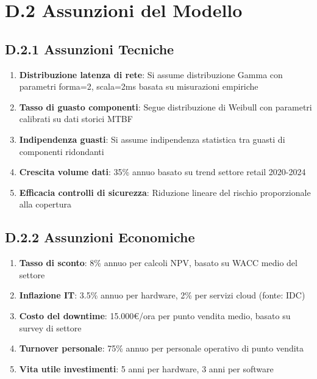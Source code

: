 \section{\texorpdfstring{\textbf{D.2 Assunzioni del Modello}}{D.2 - Assunzioni del Modello}}

\subsection{\texorpdfstring{\textbf{D.2.1 Assunzioni Tecniche}}{D.2.1 - Assunzioni Tecniche}}

\begin{enumerate}
    \item \textbf{Distribuzione latenza di rete}: Si assume distribuzione Gamma con parametri forma=2, scala=2ms basata su misurazioni empiriche
    \item \textbf{Tasso di guasto componenti}: Segue distribuzione di Weibull con parametri calibrati su dati storici MTBF
    \item \textbf{Indipendenza guasti}: Si assume indipendenza statistica tra guasti di componenti ridondanti
    \item \textbf{Crescita volume dati}: 35\% annuo basato su trend settore retail 2020-2024
    \item \textbf{Efficacia controlli di sicurezza}: Riduzione lineare del rischio proporzionale alla copertura
\end{enumerate}

\subsection{\texorpdfstring{\textbf{D.2.2 Assunzioni Economiche}}{D.2.2 - Assunzioni Economiche}}

\begin{enumerate}
    \item \textbf{Tasso di sconto}: 8\% annuo per calcoli NPV, basato su WACC medio del settore
    \item \textbf{Inflazione IT}: 3.5\% annuo per hardware, 2\% per servizi cloud (fonte: IDC)
    \item \textbf{Costo del downtime}: 15.000€/ora per punto vendita medio, basato su survey di settore
    \item \textbf{Turnover personale}: 75\% annuo per personale operativo di punto vendita
    \item \textbf{Vita utile investimenti}: 5 anni per hardware, 3 anni per software
\end{enumerate}

